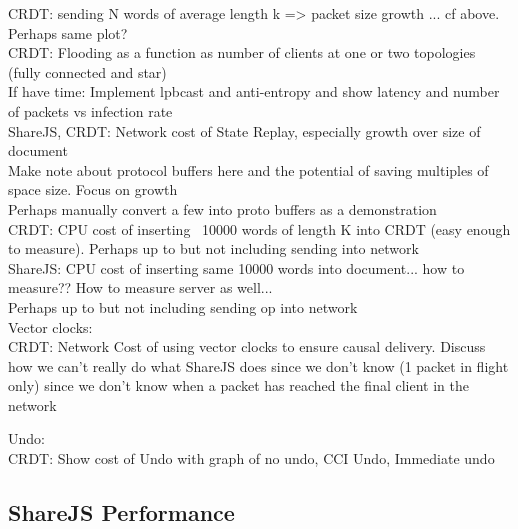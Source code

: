 \documentclass[12pt,a4paper,twoside,openright]{report}
\begin{document}
			CRDT:	 sending N words of average length k => packet size growth ... cf above. Perhaps same plot?\\
			CRDT: 	 Flooding as a function as number of clients at one or two topologies (fully connected and star)\\
			
			If have time: Implement lpbcast and anti-entropy and show latency and number of packets vs infection rate\\
			
			ShareJS, CRDT: Network cost of State Replay, especially growth over size of document\\
							Make note about protocol buffers here and the potential of saving multiples of space size. Focus on growth	\\
							Perhaps manually convert a few into proto buffers as a demonstration\\
			
			
			CRDT: 	 CPU cost of inserting ~10000 words of length K into CRDT (easy enough to measure). Perhaps up to but not including sending into network\\
			ShareJS: CPU cost of inserting same 10000 words into document... how to measure?? How to measure server as well...\\
							Perhaps up to but not including sending op into network\\
			
			Vector clocks:\\
				CRDT: Network Cost of using vector clocks to ensure causal delivery. Discuss how we can't really do what ShareJS does since we don't know (1 packet in flight only) since we don't know when a packet has reached the final client in the network
							
			Undo:\\
				CRDT: Show cost of Undo with graph of no undo, CCI Undo, Immediate undo
				
							
							
			
			
			
	
		\subsection{ShareJS Performance}
		
\end{document}

